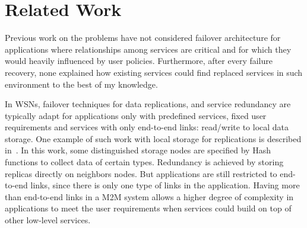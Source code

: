 

\section{Related Work}

Previous work on the problems have not considered failover architecture for
applications where relationships among services are critical and for which they would
heavily influenced by user policies. Furthermore, after every
failure recovery, none explained how existing services could find replaced
services in such environment to the best of my knowledge.

In WSNs, failover techniques for data replications, and service redundancy are
typically adapt for applications only with predefined services, fixed user
requirements and services with only end-to-end links: read/write to local data
storage. One example of such work with local storage for replications is
described in~\cite{Ratnasamy2002}. In this work, some distinguished storage
nodes are specified by Hash functions to collect data of certain types.
Redundancy is achieved by storing replicas directly on neighbors nodes. But
applications are still restricted to end-to-end links, since there is only one
type of links in the application.
Having more than end-to-end links in a M2M system allows a higher degree of
complexity in applications to meet the user requirements when services could
build on top of other low-level services.

